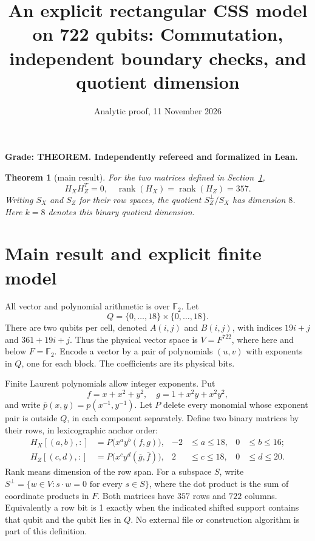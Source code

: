 \documentclass{article}
\title{An explicit rectangular CSS model on 722 qubits: Commutation, independent boundary checks, and quotient dimension}
\author{}
\date{Analytic proof, 11 November 2026}
\newtheorem{theorem}{Theorem}
\DeclareMathOperator{\rank}{rank}
\newcommand{\Ftwo}{\mathbb{F}_2}
\begin{document}
\maketitle

\textbf{Grade: THEOREM. Independently refereed and formalized in Lean.}

\begin{theorem}[main result]\label{thm:main}
  For the two matrices defined in Section~\ref{sec:model},
  \begin{equation}
    H_X H_Z^T = 0, \quad \rank(H_X) = \rank(H_Z) = 357.
  \end{equation}
  Writing \(S_X\) and \(S_Z\) for their row spaces, the quotient
  \(S_Z^{\perp}/S_X\) has dimension \(8\). Here \(k = 8\) denotes this binary
  quotient dimension.
\end{theorem}

\section{Main result and explicit finite model}\label{sec:model}

All vector and polynomial arithmetic is over \(\Ftwo\). Let
\begin{equation}
  Q = \{0, \dots, 18\} \times \{0, \dots, 18\}.
\end{equation}
There are two qubits per cell, denoted \(A(i,j)\) and \(B(i,j)\), with indices
\(19i + j\) and \(361 + 19i + j\). Thus the physical vector space is
\(V = F^{722}\), where here and below \(F = \Ftwo\). Encode a vector by a pair
of polynomials \((u, v)\) with exponents in \(Q\), one for each block. The
coefficients are its physical bits.

Finite Laurent polynomials allow integer exponents. Put
\begin{equation}
  f = x + x^2 + y^2, \quad g = 1 + x^2 y + x^2 y^2,
\end{equation}
and write \(\overline{p}(x,y) = p(x^{-1}, y^{-1})\). Let \(P\) delete every
monomial whose exponent pair is outside \(Q\), in each component separately.
Define two binary matrices by their rows, in lexicographic anchor order:
\begin{align}
  H_X[(a,b), {:}] &= P\bigl(x^a y^b (f, g)\bigr),
  & -2 &\le a \le 18, & 0 &\le b \le 16; \\
  H_Z[(c,d), {:}] &= P\bigl(x^c y^d (\overline{g}, \overline{f})\bigr),
  & 2 &\le c \le 18, & 0 &\le d \le 20.
\end{align}
Rank means dimension of the row span. For a subspace \(S\), write
\(S^{\perp} = \{w \in V : s \cdot w = 0 \text{ for every } s \in S\}\), where
the dot product is the sum of coordinate products in \(F\). Both matrices have
\(357\) rows and \(722\) columns. Equivalently a row bit is 1 exactly when the
indicated shifted support contains that qubit and the qubit lies in \(Q\). No
external file or construction algorithm is part of this definition.
\end{document}
